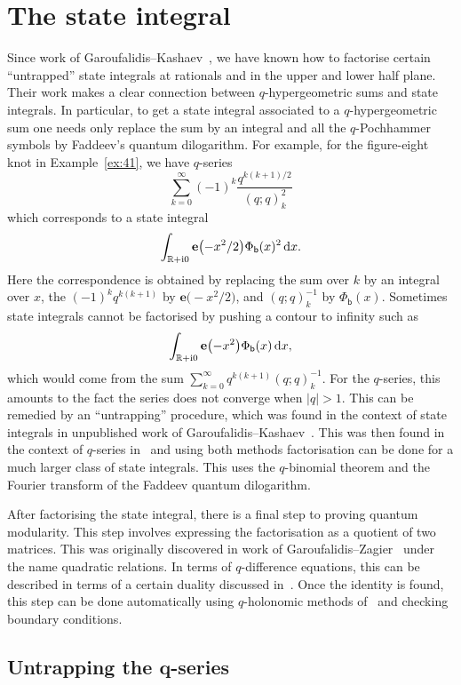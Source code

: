 \documentclass[pdftex]{sigma}
\numberwithin{equation}{section}
\def\BR{\mathbb{R}}
\def\e{\mathbf e}
\def\BR{\mathbb R}
\begin{document}
\section{The state integral}

Since work of Garoufalidis--Kashaev~\cite{GK:rat,GK:qser}, we have known how to factorise certain ``untrapped'' state integrals at rationals and in the upper and lower half plane. Their work makes a clear connection between $q$-hypergeometric sums and state integrals. In particular, to get a state integral associated to a $q$-hypergeometric sum one needs only replace the sum by an integral and all the $q$-Pochhammer symbols by Faddeev's quantum dilogarithm. For example, for the figure-eight knot in Example~\ref{ex:41}, we have $q$-series
\[
 \sum_{k=0}^{\infty}(-1)^{k}\frac{q^{k(k+1)/2}}{(q;q)_{k}^{2}}
\]
which corresponds to a state integral
\[
 \int_{\BR+{{\rm i}0}}\e\bigl(-x^2/2\bigr)\Phi_{\mathsf{b}}(x)^2\,{\rm d}x .
\]
Here the correspondence is obtained by replacing the sum over $k$ by an integral over $x$, the $(-1)^{k}q^{k(k+1)}$ by $\e\bigl(-x^2/2\bigr)$, and $(q;q)_{k}^{-1}$ by $\Phi_{\mathsf{b}}(x)$.
Sometimes state integrals cannot be factorised by pushing a contour to infinity such as
\[
 \int_{\BR+{\rm i}0}\e\bigl(-x^2\bigr)\Phi_{\mathsf{b}}(x)\, {\rm d}x ,
\]
which would come from the sum $\sum_{k=0}^{\infty}q^{k(k+1)}(q;q)_{k}^{-1}$.
For the $q$-series, this amounts to the fact the series does not converge when $|q|>1$. This can be remedied by an ``untrapping'' procedure, which was found in the context of state integrals in unpublished work of Garoufalidis--Kashaev~\cite{Gar:untraptalk}. This was then found in the context of $q$-series in~\cite{Wh:thesis} and using both methods factorisation can be done for a much larger class of state integrals. This uses the $q$-binomial theorem and the Fourier transform of the Faddeev quantum dilogarithm.

After factorising the state integral, there is a final step to proving quantum modularity. This step involves expressing the factorisation as a quotient of two matrices. This was originally discovered in work of Garoufalidis--Zagier~\cite{GZ:qser,GZ:RQMOD} under the name quadratic relations. In terms of $q$-difference equations, this can be described in terms of a certain duality discussed in~\cite{GW:qmod}. Once the identity is found, this step can be done automatically using $q$-holonomic methods of~\cite{WilfZeil,Zeilberger} and checking boundary conditions.

\subsection[Untrapping the $q$-series]{Untrapping the $\boldsymbol{q}$-series}
\end{document}
